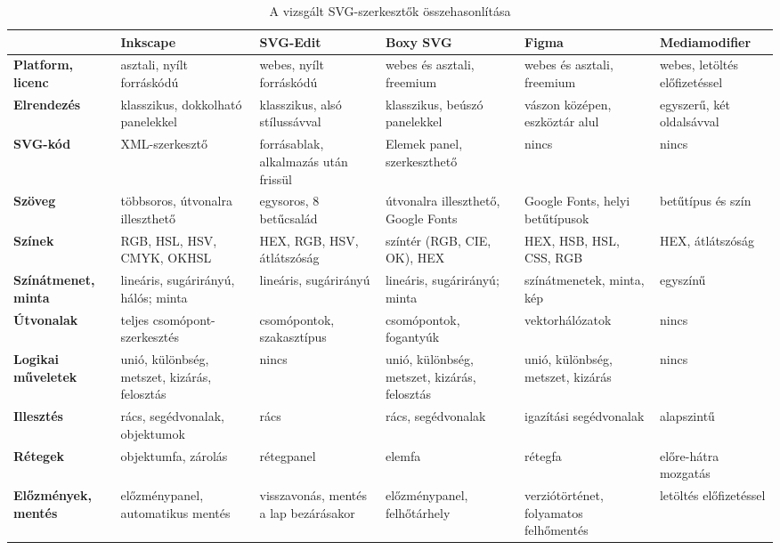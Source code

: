 \begin{table}[!htbp]
\caption{A vizsgált SVG-szerkesztők összehasonlítása}
\label{tab:svg-editors-comparison}
\centering
\scriptsize
\renewcommand{\arraystretch}{1.25}
\begin{adjustbox}{max width=\textwidth}
\begin{tabular}{|>{\raggedright\arraybackslash}p{2.0cm}|>{\raggedright\arraybackslash}p{2.5cm}|>{\raggedright\arraybackslash}p{2.5cm}|>{\raggedright\arraybackslash}p{2.5cm}|>{\raggedright\arraybackslash}p{2.5cm}|>{\raggedright\arraybackslash}p{2.3cm}|}
\hline
 & \textbf{Inkscape} & \textbf{SVG-Edit} & \textbf{Boxy SVG} & \textbf{Figma} & \textbf{Mediamodifier} \\ \hline
\textbf{Platform, licenc} & asztali, nyílt forráskódú & webes, nyílt forráskódú & webes és asztali, freemium & webes és asztali, freemium & webes, letöltés előfizetéssel \\ \hline
\textbf{Elrendezés} & klasszikus, dokkolható panelekkel & klasszikus, alsó stílussávval & klasszikus, beúszó panelekkel & vászon középen, eszköztár alul & egyszerű, két oldalsávval \\ \hline
\textbf{SVG-kód} & XML-szerkesztő & forrásablak, alkalmazás után frissül & Elemek panel, szerkeszthető & nincs & nincs \\ \hline
\textbf{Szöveg} & többsoros, útvonalra illeszthető & egysoros, 8 betűcsalád & útvonalra illeszthető, Google Fonts & Google Fonts, helyi betűtípusok & betűtípus és szín \\ \hline
\textbf{Színek} & RGB, HSL, HSV, CMYK, OKHSL & HEX, RGB, HSV, átlátszóság & 12 színtér (RGB, CIE, OK), HEX & HEX, HSB, HSL, CSS, RGB & HEX, átlátszóság \\ \hline
\textbf{Színátmenet, minta} & lineáris, sugárirányú, hálós; minta & lineáris, sugárirányú & lineáris, sugárirányú; minta & színátmenetek, minta, kép & egyszínű \\ \hline
\textbf{Útvonalak} & teljes csomópont-szerkesztés & csomópontok, szakasztípus & csomópontok, fogantyúk & vektorhálózatok & nincs \\ \hline
\textbf{Logikai műveletek} & unió, különbség, metszet, kizárás, felosztás & nincs & unió, különbség, metszet, kizárás, felosztás & unió, különbség, metszet, kizárás & nincs \\ \hline
\textbf{Illesztés} & rács, segédvonalak, objektumok & rács & rács, segédvonalak & igazítási segédvonalak & alapszintű \\ \hline
\textbf{Rétegek} & objektumfa, zárolás & rétegpanel & elemfa & rétegfa & előre-hátra mozgatás \\ \hline
\textbf{Előzmények, mentés} & előzménypanel, automatikus mentés & visszavonás, mentés a lap bezárásakor & előzménypanel, felhőtárhely & verziótörténet, folyamatos felhőmentés & letöltés előfizetéssel \\ \hline
\end{tabular}
\end{adjustbox}
\end{table}

